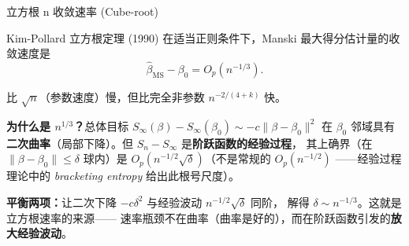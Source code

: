 \documentclass[aspectratio=169, 10pt]{beamer}
\begin{document}
\begin{frame}{立方根 n 收敛速率 (Cube-root)}

  \begin{definitionbox}{{Kim-Pollard 立方根定理 (1990)}}
    在适当正则条件下，Manski 最大得分估计量的收敛速度是
    $$\boxed{\;\hat\beta_{\text{MS}} - \beta_0 = O_p(n^{-1/3}).\;}$$

    比 $\sqrt{n}$（参数速度）慢，但比完全非参数 $n^{-2/(4+k)}$ 快。
  \end{definitionbox}

  \begin{highlightbox}
    \textbf{为什么是 $n^{1/3}$？}总体目标 $S_\infty(\beta) - S_\infty(\beta_0) \sim -c\|\beta - \beta_0\|^2$
    在 $\beta_0$ 邻域具有\textbf{二次曲率}（局部下降）。但 $S_n - S_\infty$ 是\textbf{阶跃函数的经验过程}，
    其上确界（在 $\|\beta - \beta_0\|\leq\delta$ 球内）是 $O_p(n^{-1/2}\sqrt{\delta})$（不是常规的 $O_p(n^{-1/2})$
    ——经验过程理论中的 \emph{bracketing entropy} 给出此根号尺度）。

    \textbf{平衡两项：}让二次下降 $-c\delta^2$ 与经验波动 $n^{-1/2}\sqrt{\delta}$ 同阶，
    解得 $\delta \sim n^{-1/3}$。这就是立方根速率的来源——
    速率瓶颈不在曲率（曲率是好的），而在阶跃函数引发的\textbf{放大经验波动}。
  \end{highlightbox}

  \hypertarget{main-c13}{}
  \hfill{\scriptsize\hyperlink{proof-c13}{}}

\end{frame}
\end{document}
